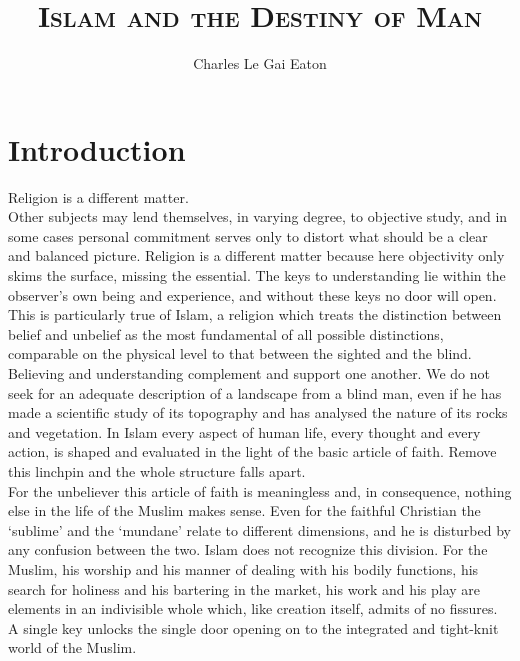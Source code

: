 \documentclass[10pt, twoside]{book}
\title{\LARGE \textbf{\textsc{Islam and the Destiny of Man}}}
\author{\Large Charles Le Gai Eaton}
\date{ }
\begin{document}


\maketitle
\tableofcontents

\frontmatter
{}

\chapter{Introduction}

Religion is a different matter.\\

Other subjects may lend themselves, in varying degree, to objective study, and in some cases personal commitment serves only to distort what should be a clear and balanced picture. Religion is a different matter because here objectivity only skims the surface, missing the essential. The keys to understanding lie within the observer's own being and experience, and without these keys no door will open. This is particularly true of Islam, a religion which treats the distinction between belief and unbelief as the most fundamental of all possible distinctions, comparable on the physical level to that between the sighted and the blind. Believing and understanding complement and support one another. We do not seek for an adequate description of a landscape from a blind man, even if he has made a scientific study of its topography and has analysed the nature of its rocks and vegetation. In Islam every aspect of human life, every thought and every action, is shaped and evaluated in the light of the basic article of faith. Remove this linchpin and the whole structure falls apart.\\

For the unbeliever this article of faith is meaningless and, in consequence, nothing else in the life of the Muslim makes sense. Even for the faithful Christian the `sublime' and the `mundane' relate to different dimensions, and he is disturbed by any confusion between the two. Islam does not recognize this division. For the Muslim, his worship and his manner of dealing with his bodily functions, his search for holiness and his bartering in the market, his work and his play are elements in an indivisible whole which, like creation itself, admits of no fissures. A single key unlocks the single door opening on to the integrated and tight\hyp{}knit world of the Muslim.\\
\end{document}
